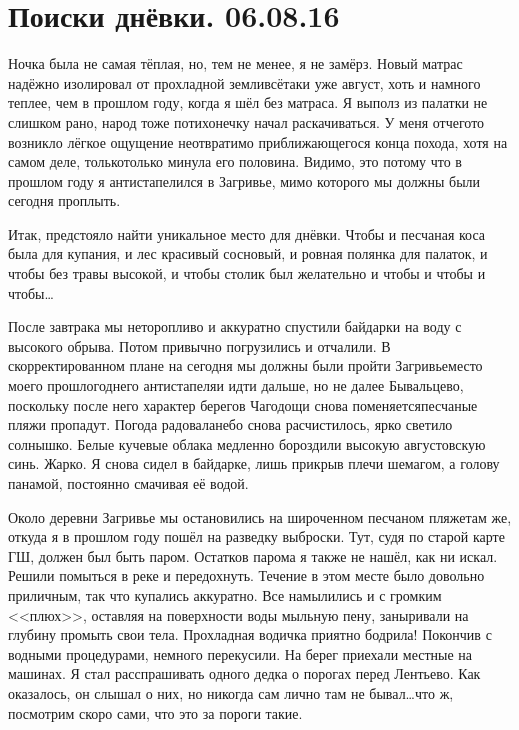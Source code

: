 \chapter{Поиски днёвки. 06.08.16} 

Ночка была не самая тёплая, но, тем не менее, я не замёрз. Новый матрас надёжно изолировал от прохладной земли\mdash всё\sdash таки уже август, хоть и намного теплее, чем в прошлом году, когда я шёл без матраса. Я выполз из палатки не слишком рано, народ тоже потихонечку начал раскачиваться. У меня отчего\sdash то возникло лёгкое ощущение неотвратимо приближающегося конца похода, хотя на самом деле, только\sdash только минула его половина. Видимо, это потому что в прошлом году я антистапелился в Загривье, мимо которого мы должны были сегодня проплыть. 
 
Итак, предстояло найти уникальное место для днёвки. Чтобы и песчаная коса была для купания, и лес красивый сосновый, и ровная полянка для палаток, и чтобы без травы высокой, и чтобы столик был желательно и чтобы и чтобы и чтобы\ldots  

После завтрака мы неторопливо и аккуратно спустили байдарки на воду с высокого обрыва. Потом привычно погрузились и отчалили. В скорректированном плане на сегодня мы должны были пройти Загривье\mdash место моего прошлогоднего антистапеля\mdash и идти дальше, но не далее Бывальцево, поскольку после него характер берегов Чагодощи снова поменяется\mdash песчаные пляжи пропадут. Погода радовала\mdash небо снова расчистилось, ярко светило солнышко. Белые кучевые облака медленно бороздили высокую августовскую синь. Жарко. Я снова сидел в байдарке, лишь прикрыв плечи шемагом, а голову панамой, постоянно смачивая её водой. 

Около деревни Загривье мы остановились на широченном песчаном пляже\mdash там же, откуда я в прошлом году пошёл на разведку выброски. Тут, судя по старой карте ГШ, должен был быть паром. Остатков парома я также не нашёл, как ни искал. Решили помыться в реке и передохнуть. Течение в этом месте было довольно приличным, так что купались аккуратно. Все намылились и с громким <<плюх>>, оставляя на поверхности воды мыльную пену, заныривали на глубину промыть свои тела. Прохладная водичка приятно бодрила! Покончив с водными процедурами, немного перекусили. На берег приехали местные на машинах. Я стал расспрашивать одного дедка о порогах перед Лентьево. Как оказалось, он слышал о них, но никогда сам лично там не бывал\ldots  что ж, посмотрим скоро сами, что это за пороги такие. 

